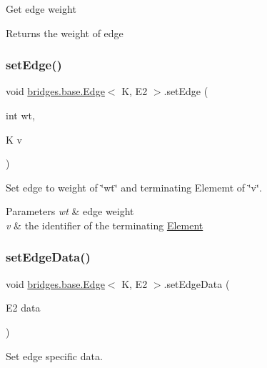 Get edge weight

\begin{DoxyReturn}{Returns}
the weight of edge 
\end{DoxyReturn}
\mbox{\label{classbridges_1_1base_1_1_edge_aaa68d6a438529aebd69d8b45dc90314e}} 
\subsubsection{\texorpdfstring{set\+Edge()}{setEdge()}}
{\footnotesize\ttfamily void \mbox{\hyperlink{classbridges_1_1base_1_1_edge}{bridges.\+base.\+Edge}}$<$ K, E2 $>$.set\+Edge (\begin{DoxyParamCaption}\item[{int}]{wt,  }\item[{K}]{v }\end{DoxyParamCaption})}

Set edge to weight of \char`\"{}wt\char`\"{} and terminating Elememt of \char`\"{}v\char`\"{}.


\begin{DoxyParams}{Parameters}
{\em wt} & edge weight \\
\hline
{\em v} & the identifier of the terminating \mbox{\hyperlink{classbridges_1_1base_1_1_element}{Element}} \\
\hline
\end{DoxyParams}
\mbox{\label{classbridges_1_1base_1_1_edge_a733d7f5eb4950d1fc4e14b7096faeb5c}} 
\subsubsection{\texorpdfstring{set\+Edge\+Data()}{setEdgeData()}}
{\footnotesize\ttfamily void \mbox{\hyperlink{classbridges_1_1base_1_1_edge}{bridges.\+base.\+Edge}}$<$ K, E2 $>$.set\+Edge\+Data (\begin{DoxyParamCaption}\item[{E2}]{data }\end{DoxyParamCaption})}

Set edge specific data.


